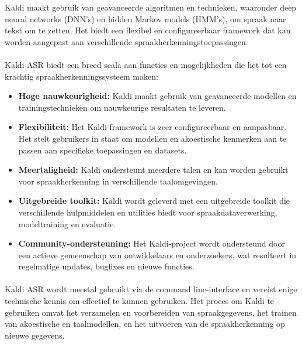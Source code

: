 Kaldi maakt gebruik van geavanceerde algoritmen en technieken, waaronder deep neural networks (DNN's) en hidden Markov models (HMM's), om spraak naar tekst om te zetten. Het biedt een flexibel en configureerbaar framework dat kan worden aangepast aan verschillende spraakherkenningstoepassingen.

\paragraph{}
Kaldi ASR biedt een breed scala aan functies en mogelijkheden die het tot een krachtig spraakherkenningssysteem maken:

\begin{itemize}
    \item \textbf{Hoge nauwkeurigheid:} Kaldi maakt gebruik van geavanceerde modellen en trainingstechnieken om nauwkeurige resultaten te leveren.

    \item \textbf{Flexibiliteit:} Het Kaldi-framework is zeer configureerbaar en aanpasbaar. Het stelt gebruikers in staat om modellen en akoestische kenmerken aan te passen aan specifieke toepassingen en datasets.

    \item \textbf{Meertaligheid:} Kaldi ondersteunt meerdere talen en kan worden gebruikt voor spraakherkenning in verschillende taalomgevingen.

    \item \textbf{Uitgebreide toolkit:} Kaldi wordt geleverd met een uitgebreide toolkit die verschillende hulpmiddelen en utilities biedt voor spraakdataverwerking, modeltraining en evaluatie.

    \item \textbf{Community-ondersteuning:} Het Kaldi-project wordt ondersteund door een actieve gemeenschap van ontwikkelaars en onderzoekers, wat resulteert in regelmatige updates, bugfixes en nieuwe functies.
\end{itemize}

\paragraph{}
Kaldi ASR wordt meestal gebruikt via de command line-interface en vereist enige technische kennis om effectief te kunnen gebruiken. Het proces om Kaldi te gebruiken omvat het verzamelen en voorbereiden van spraakgegevens, het trainen van akoestische en taalmodellen, en het uitvoeren van de spraakherkenning op nieuwe gegevens.

